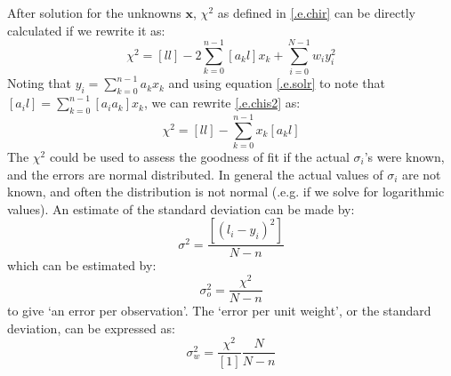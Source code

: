 After solution for the unknowns $\mathbf{x}$, $\chi^{2}$ as defined in
\eqref{.e.chir} can be directly calculated if we rewrite it as:
\begin{equation}
	\chi^{2} = [ll] - 2\sum_{k=0}^{n-1}[a_{k}l]x_{k} +
			\sum_{i=0}^{N-1}  w_{i}y_{i}^{2}
\label{.e.chis2}
\end{equation}
Noting that $y_{i}=\sum_{k=0}^{n-1}a_{k}x_{k}$ and using equation
\eqref{.e.solr} to note
that $[a_{i}l]=\sum_{k=0}^{n-1} [a_{i}a_{k}]x_{k}$, we can rewrite
\eqref{.e.chis2} as:
\begin{equation}
	\chi^{2} = [ll] -  \sum_{k=0}^{n-1} x_{k}[a_{k}l]
\label{.e.chis3}
\end{equation}
The $\chi^{2}$ could be used to assess the goodness of fit if the actual
$\sigma_{i}$'s were known, and the errors are normal distributed. In general the
actual values of $\sigma_{i}$ are not known, and often the distribution is not
normal (.e.g. if we solve for logarithmic values). An estimate of the standard
deviation can be made by:
\begin{equation}
	\sigma^{2}=
	\frac{\left[ \left( l_{i}-y_{i}\right)^{2}\right]}{N-n}
\end{equation}
which can be estimated by:
\begin{equation}
	\sigma_{o}^{2}=\frac{\chi^{2}}{N-n}
\end{equation}
to give `an error per observation'. The `error per unit weight', or the
standard deviation, can be expressed as:
\begin{equation}
	\sigma_{w}^{2}=\frac{\chi^{2}}{[1]}\frac{N}{N-n}
\end{equation}

